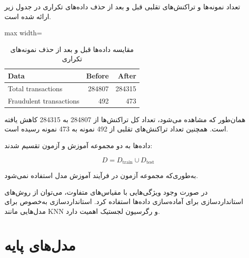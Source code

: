 \documentclass[10pt,a4paper,twocolumn]{article}
\begin{document}
تعداد نمونه‌ها و تراکنش‌های تقلبی قبل و بعد از حذف داده‌های
تکراری در جدول زیر ارائه شده است.

\begin{table}[H]

\centering

\caption{مقایسه داده‌ها قبل و بعد از حذف نمونه‌های تکراری}

\vspace{0.15cm}

\begin{adjustbox}{max width=\columnwidth}

\begin{tabular}{|l|r|r|}

\hline

\textbf{Data} & \textbf{Before} & \textbf{After} \\

\hline

Total transactions & 284807 & 284315 \\

\hline

Fraudulent transactions & 492 & 473 \\

\hline

\end{tabular}

\end{adjustbox}

\label{tab:duplicate-removal}

\end{table}

همان‌طور که مشاهده می‌شود، تعداد کل تراکنش‌ها از
284807 به 284315 کاهش یافته است. همچنین تعداد تراکنش‌های
تقلبی از 492 نمونه به 473 نمونه رسیده است.

داده‌ها به دو مجموعه آموزش و آزمون تقسیم شدند:

\[
D = D_{\mathrm{train}} \cup D_{\mathrm{test}}
\]

به‌طوری‌که مجموعه آزمون در فرآیند آموزش مدل استفاده نمی‌شود.

در صورت وجود ویژگی‌هایی با مقیاس‌های متفاوت، می‌توان از
روش‌های استانداردسازی برای آماده‌سازی داده‌ها استفاده کرد.
استانداردسازی به‌خصوص برای مدل‌هایی مانند KNN و رگرسیون
لجستیک اهمیت دارد.


\section{مدل‌های پایه}
\end{document}

